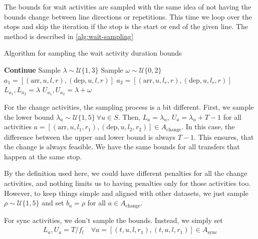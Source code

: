 \documentclass[english, 12pt, a4paper, sci, utf8, a-2b, online]{aaltothesis}
\newcommand{\Async}{A_\text{sync}}
\newcommand{\unif}[1]{\mathcal{U}\{#1\}}
\begin{document}
The bounds for wait activities are sampled with the same idea of not having the bounds change between line directions or repetitions. This time we loop over the stops and skip the iteration if the stop is the start or end of the given line. The method is described in \cref{alg:wait-sampling}

\begin{algorithm}

    \caption{Algorithm for sampling the wait activity duration bounds}
    \label{alg:wait-sampling}
    \begin{algorithmic}
                    \State \textbf{Continue}
                \EndIf
                \State Sample $\lambda \sim \unif{1, 3}$ 
                \State Sample $\omega \sim \unif{0, 2}$ 
                    \State $a_1 = [(\text{arr}, u, l, r), (\text{dep}, u, l, r)]$ 
                    \State $a_2 = [(\text{arr}, u, l_r, r), (\text{dep}, u, l_r, r)]$ 
                    \State $L_{a_1}, L_{a_2} = \lambda$
                    \State $U_{a_1}, U_{a_2} = \lambda + \omega$
                \EndFor
            \EndFor
        \EndFor
    \end{algorithmic}
    
\end{algorithm}

For the change activities, the sampling process is a bit different. First, we sample the lower bound $\lambda_u \sim \unif{1, 5}\ \forall u \in S$. Then, $L_a = \lambda_u,\ U_a = \lambda_u + T - 1$ for all activities $a = [(\text{arr}, u, l_1, r_1), (\text{dep}, u, l_2, r_2)] \in A_\text{change}$. In this case, the difference between the upper and lower bound is always $T-1$. This ensures, that the change is always feasible. We have the same bounds for all transfers that happen at the same stop.

By the definition used here, we could have different penalties for all the change activities, and nothing limits us to having penalties only for those activities too. However, to keep things simple and aligned with other datasets, we just sample $\rho \sim \unif{1, 5}$ and set $b_a = \rho$ for all $a \in A_\text{change}$.

For sync activities, we don't sample the bounds. Instead, we simply set
\begin{align}
    L_a, U_a = T / f_l\quad  \forall a = [(t, u, l, r_1), (t, u, l, r_1)] \in \Async
\end{align}
\end{document}
